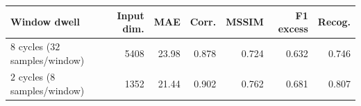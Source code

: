 \begin{tabular}{lrrrrrr}
\hline
Window dwell & Input dim. & MAE & Corr. & MSSIM & F1 excess & Recog. \\
\hline
$8$ cycles ($32$ samples/window) & 5408 & 23.98 & 0.878 & 0.724 & 0.632 & 0.746 \\
$2$ cycles ($8$ samples/window) & 1352 & 21.44 & 0.902 & 0.762 & 0.681 & 0.807 \\
\hline
\end{tabular}
